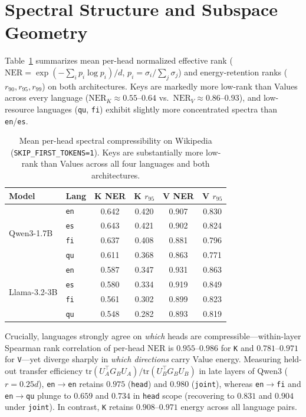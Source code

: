 \documentclass[11pt,a4paper,twocolumn]{article}
\begin{document}
\section{Spectral Structure and Subspace Geometry}
\label{sec:spectra}
Table~\ref{tab:spectra} summarizes mean per-head normalized effective rank ($\mathrm{NER} = \exp(-\sum_i p_i \log p_i)/d$, $p_i = \sigma_i / \sum_j \sigma_j$) and energy-retention ranks ($r_{90}, r_{95}, r_{99}$) on both architectures. Keys are markedly more low-rank than Values across every language ($\mathrm{NER}_K \approx 0.55$--$0.64$ vs.\ $\mathrm{NER}_V \approx 0.86$--$0.93$), and low-resource languages (\texttt{qu}, \texttt{fi}) exhibit slightly more concentrated spectra than \texttt{en}/\texttt{es}.

\begin{table}[t]
\centering
\small
\setlength{\tabcolsep}{3.8pt}
\begin{tabular}{llcccc}
\toprule
Model & Lang & K NER & K $r_{95}$ & V NER & V $r_{95}$ \\
\midrule
\multirow{4}{*}{Qwen3-1.7B}
  & \texttt{en} & 0.642 & 0.420 & 0.907 & 0.830 \\
  & \texttt{es} & 0.643 & 0.421 & 0.902 & 0.824 \\
  & \texttt{fi} & 0.637 & 0.408 & 0.881 & 0.796 \\
  & \texttt{qu} & 0.611 & 0.368 & 0.863 & 0.771 \\
\midrule
\multirow{4}{*}{Llama-3.2-3B}
  & \texttt{en} & 0.587 & 0.347 & 0.931 & 0.863 \\
  & \texttt{es} & 0.580 & 0.334 & 0.919 & 0.849 \\
  & \texttt{fi} & 0.561 & 0.302 & 0.899 & 0.823 \\
  & \texttt{qu} & 0.548 & 0.282 & 0.893 & 0.819 \\
\bottomrule
\end{tabular}
\caption{Mean per-head spectral compressibility on Wikipedia (\texttt{SKIP\_FIRST\_TOKENS=1}). Keys are substantially more low-rank than Values across all four languages and both architectures.}
\label{tab:spectra}
\end{table}

Crucially, languages strongly agree on \emph{which} heads are compressible---within-layer Spearman rank correlation of per-head NER is $0.955$--$0.986$ for \texttt{K} and $0.781$--$0.971$ for \texttt{V}---yet diverge sharply in \emph{which directions} carry Value energy. Measuring held-out transfer efficiency $\mathrm{tr}(U_A^\top G_B U_A)/\mathrm{tr}(U_B^\top G_B U_B)$ in late layers of Qwen3 ($r=0.25d$), \texttt{en}$\rightarrow$\texttt{en} retains $0.975$ (\texttt{head}) and $0.980$ (\texttt{joint}), whereas \texttt{en}$\rightarrow$\texttt{fi} and \texttt{en}$\rightarrow$\texttt{qu} plunge to $0.659$ and $0.734$ in \texttt{head} scope (recovering to $0.831$ and $0.904$ under \texttt{joint}). In contrast, \texttt{K} retains $0.908$--$0.971$ energy across all language pairs.
\end{document}
